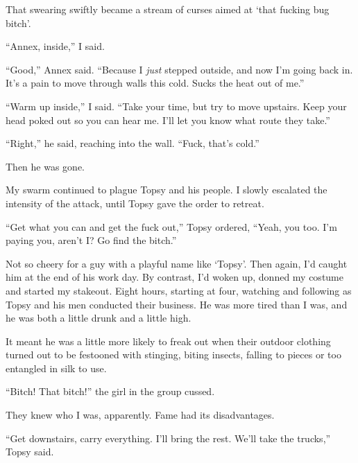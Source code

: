 That swearing swiftly became a stream of curses aimed at `that fucking bug bitch'.



``Annex, inside,'' I said.



``Good,'' Annex said.  ``Because I \emph{just} stepped outside, and now I'm going back in.  It's a pain to move through walls this cold.  Sucks the heat out of me.''



``Warm up inside,'' I said.  ``Take your time, but try to move upstairs.  Keep your head poked out so you can hear me.  I'll let you know what route they take.''



``Right,'' he said, reaching into the wall.  ``Fuck, that's cold.''



Then he was gone.



My swarm continued to plague Topsy and his people.  I slowly escalated the intensity of the attack, until Topsy gave the order to retreat.



``Get what you can and get the fuck out,'' Topsy ordered, ``Yeah, you too.  I'm paying you, aren't I?  Go find the bitch.''



Not so cheery for a guy with a playful name like `Topsy'.  Then again, I'd caught him at the end of his work day.  By contrast, I'd woken up, donned my costume and started my stakeout.  Eight hours, starting at four, watching and following as Topsy and his men conducted their business.  He was more tired than I was, and he was both a little drunk and a little high.



It meant he was a little more likely to freak out when their outdoor clothing turned out to be festooned with stinging, biting insects, falling to pieces or too entangled in silk to use.



``Bitch!  That bitch!'' the girl in the group cussed.



They knew who I was, apparently.  Fame had its disadvantages.



``Get downstairs, carry everything.  I'll bring the rest.  We'll take the trucks,'' Topsy said.



